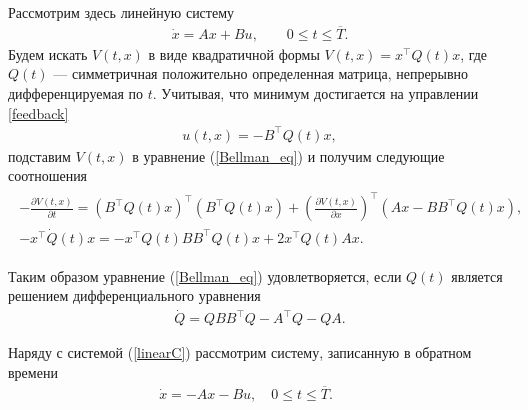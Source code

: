 \documentclass[../main.tex]{subfiles}
\begin{document}
Рассмотрим здесь линейную систему
\begin{gather}\label{linearC}
	\dot{x} =  A  x + B u, \qquad 0 \leqslant t \leqslant \overline{T}.
\end{gather}
Будем искать $V(t,x)$ в виде квадратичной формы $V(t,x)=x^\top Q(t)x $, где $Q(t)$ --- симметричная положительно определенная матрица, непрерывно дифференцируемая по $t$. Учитывая, что минимум достигается на управлении \eqref{feedback} 
\begin{gather}\label{linear_feedback}
	u(t,x) = -B^{\top} Q(t) x,
\end{gather}
подставим $V(t,x)$ в уравнение (\ref{Bellman_eq}) и получим следующие соотношения
\begin{gather*}
	\begin{gathered}
	-\frac{\partial V(t,x)}{\partial t} =  \left( B^{\top} Q(t) x\right) ^{\top} \left( B^{\top} Q(t) x\right)  + \left(\frac{\partial V(t,x)}{\partial x}\right)^{\top} \left(A x - B B^{\top} Q(t) x\right), \\
	-x^{\top} \dot{Q}(t) x =  -x^{\top} Q(t) B B^{\top} Q(t) x  + 2 x^{\top} Q(t) A x.	
	\end{gathered}
\end{gather*}

Таким образом уравнение (\ref{Bellman_eq}) удовлетворяется, если $Q(t)$ является решением дифференциального уравнения
\begin{gather}\label{eqQ}
	\dot{Q}  = Q B B^{\top} Q - A^{\top}Q - Q A.
\end{gather}

Наряду с системой (\ref{linearC}) рассмотрим систему, записанную в обратном времени
\begin{gather}\label{linear-}
	\dot{x} =  -A  x - B u, \quad 0 \leqslant t \leqslant \overline{T}. \qquad 
\end{gather}
\end{document}
